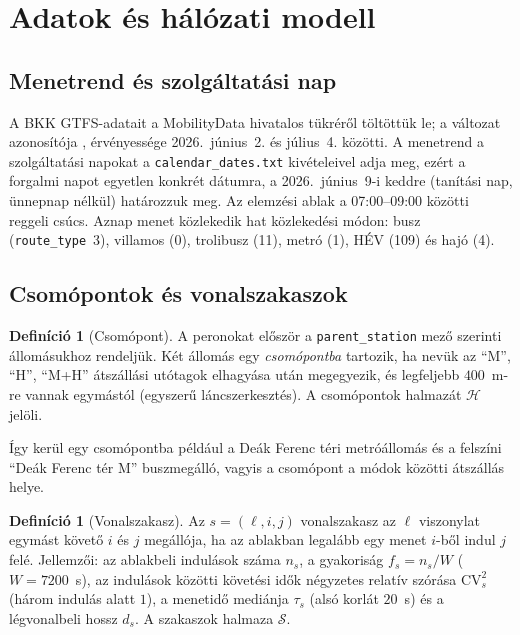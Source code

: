 \documentclass[12pt,a4paper]{article}
\theoremstyle{definition}
\newtheorem{definicio}[tetel]{Definíció}
\theoremstyle{remark}
\newcommand{\Hs}{\mathcal{H}}
\newcommand{\Ss}{\mathcal{S}}
\begin{document}
\section{Adatok és hálózati modell}
\label{sec:adat}

\subsection{Menetrend és szolgáltatási nap}

A BKK GTFS-adatait a MobilityData hivatalos tükréről töltöttük le; a
változat azonosítója \texttt{\FEEDVER}, érvényessége 2026.~június~2. és
július~4. közötti. A menetrend a szolgáltatási napokat a
\texttt{calendar\_dates.txt} kivételeivel adja meg, ezért a forgalmi napot
egyetlen konkrét dátumra, a 2026.~június~9-i keddre (tanítási nap, ünnepnap
nélkül) határozzuk meg. Az elemzési ablak a 07:00--09:00 közötti reggeli
csúcs. Aznap \NTRIPS{} menet közlekedik hat közlekedési módon: busz
(\texttt{route\_type}~3), villamos (0), trolibusz (11), metró (1), HÉV (109)
és hajó (4).

\subsection{Csomópontok és vonalszakaszok}

\begin{definicio}[Csomópont]
A peronokat először a \texttt{parent\_station} mező szerinti állomásukhoz
rendeljük. Két állomás egy \emph{csomópontba} tartozik, ha nevük az
\enquote{M}, \enquote{H}, \enquote{M+H} átszállási utótagok elhagyása után
megegyezik, és legfeljebb $400$~m-re vannak egymástól (egyszerű
láncszerkesztés). A csomópontok halmazát $\Hs$ jelöli.
\end{definicio}

Így kerül egy csomópontba például a Deák Ferenc téri metróállomás és a
felszíni \enquote{Deák Ferenc tér M} buszmegálló, vagyis a csomópont a módok
közötti átszállás helye.

\begin{definicio}[Vonalszakasz]
Az $s=(\ell,i,j)$ vonalszakasz az $\ell$ viszonylat egymást követő $i$ és $j$
megállója, ha az ablakban legalább egy menet $i$-ből indul $j$ felé. Jellemzői:
az ablakbeli indulások száma $n_s$, a gyakoriság $f_s=n_s/W$ ($W=7200$~s), az
indulások közötti követési idők négyzetes relatív szórása $\mathrm{CV}^2_s$
(három indulás alatt $1$), a menetidő mediánja $\tau_s$ (alsó korlát $20$~s)
és a légvonalbeli hossz $d_s$. A szakaszok halmaza $\Ss$.
\end{definicio}
\end{document}
